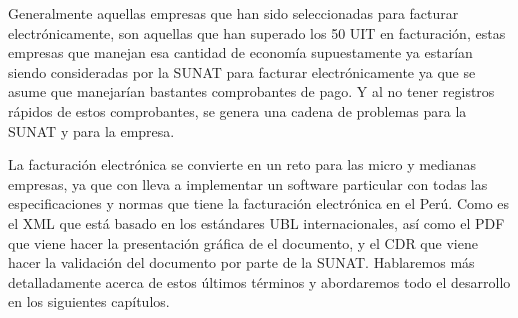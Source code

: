 Generalmente aquellas empresas que han sido seleccionadas para facturar electrónicamente, son aquellas que han superado los 50 UIT en facturación, estas empresas que manejan esa cantidad de economía supuestamente ya estarían siendo consideradas por la SUNAT para facturar electrónicamente ya que se asume que manejarían bastantes comprobantes de pago. Y al no tener registros rápidos de estos comprobantes, se genera una cadena de problemas para la SUNAT y para la empresa.

La facturación electrónica se convierte en un reto para las micro y medianas empresas, ya que con lleva a implementar un software particular con todas las especificaciones y normas que tiene la facturación electrónica en el Perú. Como es el XML que está basado en los estándares UBL internacionales, así como el PDF que viene hacer la presentación gráfica de el documento, y el CDR que viene hacer la validación del documento por parte de la SUNAT. Hablaremos más detalladamente acerca de estos últimos términos y abordaremos todo el desarrollo en los siguientes capítulos.